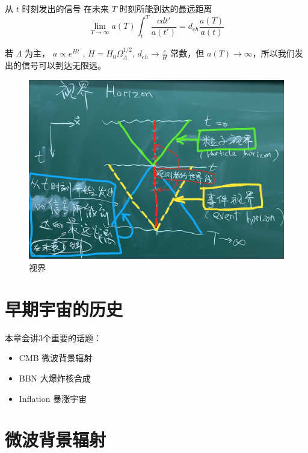 \documentclass[12pt]{ctexart}
\begin{document}
\subsection{}
从  $t$ 时刻发出的信号 在未来 $T$ 时刻所能到达的最远距离
\begin{equation}
    \lim_{T \to \infty}   a(T) \int_t^T \frac{cdt'}{a(t')} = d_{eh} \frac{a(T)}{a(t)}
\end{equation}

若 $\Lambda$ 为主， $a\propto e^{Ht}$ , $H=H_0 \Omega_\Lambda^{1/2}$,  $d_{eh}\to \frac{c}{H}$ 常数，但 $a(T)\to \infty$，所以我们发出的信号可以到达无限远。 

\begin{figure}[!hbtp]
	\centering
	\includegraphics[width=1.0\linewidth]{horizon.jpg}
	\caption{视界}
\end{figure}

\section{早期宇宙的历史}

本章会讲3个重要的话题：
\begin{itemize}
    \item CMB 微波背景辐射
    \item BBN 大爆炸核合成
    \item Inflation 暴涨宇宙
\end{itemize}

\section{微波背景辐射}
\end{document}
